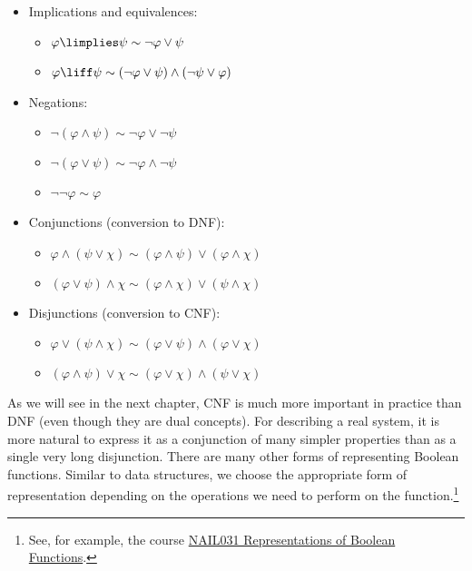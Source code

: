 \begin{tcolorbox}
\begin{multicols}{2}
\begin{itemize}
    \item Implications and equivalences:
    \begin{itemize}
        \item[] $\varphi \limplies \psi \sim \neg \varphi \lor \psi$
        \item[] $\varphi \liff \psi \sim (\neg \varphi \lor \psi) \land (\neg \psi \lor \varphi)$
    \end{itemize}
    \item Negations:
    \begin{itemize}
        \item[] $\neg (\varphi \land \psi) \sim \neg \varphi \lor \neg \psi$
        \item[] $\neg (\varphi \lor \psi) \sim \neg \varphi \land \neg \psi$
        \item[] $\neg \neg \varphi \sim \varphi$
    \end{itemize}
    \item Conjunctions (conversion to DNF):
    \begin{itemize}
        \item[] $\varphi \land (\psi \lor \chi) \sim (\varphi \land \psi) \lor (\varphi \land \chi)$
        \item[] $(\varphi \lor \psi) \land \chi \sim (\varphi \land \chi) \lor (\psi \land \chi)$
    \end{itemize}
    \item Disjunctions (conversion to CNF):
    \begin{itemize}
        \item[] $\varphi \lor (\psi \land \chi) \sim (\varphi \lor \psi) \land (\varphi \lor \chi)$
        \item[] $(\varphi \land \psi) \lor \chi \sim (\varphi \lor \chi) \land (\psi \lor \chi)$
    \end{itemize}
\end{itemize}
\end{multicols}
\end{tcolorbox}

As we will see in the next chapter, CNF is much more important in practice than DNF (even though they are dual concepts). For describing a real system, it is more natural to express it as a conjunction of many simpler properties than as a single very long disjunction. There are many other forms of representing Boolean functions. Similar to data structures, we choose the appropriate form of representation depending on the operations we need to perform on the function.\footnote{See, for example, the course \href{https://is.cuni.cz/studium/predmety/index.php?do=predmet&kod=NAIL031}{NAIL031 Representations of Boolean Functions}.}



